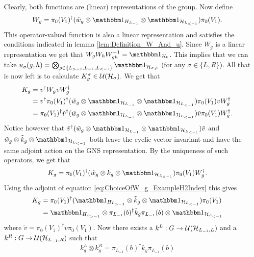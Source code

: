\documentclass[11pt,a4paper,twoside]{article}
\numberwithin{equation}{section}
\begin{document}
	Clearly, both functions are (linear) representations of the group. Now define
	\begin{equation}\label{eq:ChoiceOfW_g_ExampleH2Index}
		W_g=\pi_{0}(V_1)^{\dagger}(\tilde{w}_g\otimes\id_{H_{L_{-1}}}\otimes\id_{\HH_{L_{<-1}}}) \pi_{0}(V_1).
	\end{equation}
	This operator-valued function is also a linear representation and satisfies the conditions indicated in lemma \ref{lem:Definition_W_And_u}. Since $W_g$ is a linear representation we get that $W_gW_hW_{gh}^{-1}=\id_{\HH_0}$. This implies that we can take $u_\sigma(g,h)=\bigotimes_{\rho\in\{L_{>-1},L_{-1},L_{<-1}\}}\id_{\HH_{\sigma,\rho}}$ (for any $\sigma\in\{L,R\}$). All that is now left is to calculate $K^\sigma_g\in\mathcal U(\mathcal H_\sigma)$. We get that
	\begin{align}
		K_g&=v^\dagger W_g v W_g^\dagger\\
		&=v^\dagger \pi_{0}(V_1)^{\dagger}(\tilde{w}_g\otimes\id_{\HH_{L_{-1}}}\otimes\id_{\HH_{L_{<-1}}}) \pi_{0}(V_1) v W_g^\dagger\\
		&=\pi_{0}(V_1)^{\dagger}\tilde v^\dagger(\tilde{w}_g\otimes\id_{\HH_{L_{-1}}}\otimes\id_{\HH_{L_{<-1}}}) \tilde v \pi_{0}(V_1) W_g^\dagger.
	\end{align}
	Notice however that $\tilde v^\dagger(\tilde{w}_g\otimes\id_{\HH_{L_{-1}}}\otimes\id_{\HH_{L_{<-1}}}) \tilde v$ and $\tilde{w}_g\otimes\tilde{k}_g\otimes\id_{\HH_{L_{<-1}}}$ both leave the cyclic vector invariant and have the same adjoint action on the GNS representation. By the uniqueness of such operators, we get that
	\begin{equation}
		K_g=\pi_{0}(V_1)^{\dagger}(\tilde{w}_g\otimes\tilde{k}_g\otimes\id_{\HH_{L_{<-1}}}) \pi_{0}(V_1) W_g^\dagger.
	\end{equation}
	Using the adjoint of equation \eqref{eq:ChoiceOfW_g_ExampleH2Index} this gives
	\begin{align}
		K_g&=\pi_{0}(V_1)^{\dagger}(\id_{H_{L_{>-1}}}\otimes \tilde k_g \otimes\id_{\HH_{L_{<-1}}}) \pi_{0}(V_1)\\
		&=\id_{H_{L_{>-1}}}\otimes \pi_{L_{-1}}(b)^\dagger \tilde k_g \pi_{L_{-1}}(b) \otimes\id_{\HH_{L_{<-1}}}
	\end{align}
	where $\tilde{v}=\pi_0(V_1)^\dagger v\pi_0(V_1)$. Now there exists a $k^L:G\rightarrow \mathcal U(\mathcal H_{L_{-1},L})$ and a $k^R:G\rightarrow \mathcal U(\mathcal H_{L_{-1},R})$ such that
	\begin{equation}
		k^L_g\otimes k^R_g=\pi_{L_{-1}}(b)^\dagger \tilde k_g \pi_{L_{-1}}(b)
	\end{equation}
\end{document}
